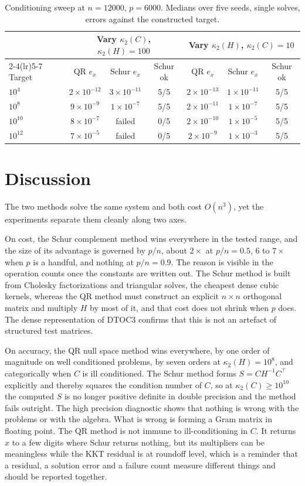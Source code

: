 \documentclass[10pt]{article}
\newcommand{\kap}{\kappa_2}
\begin{document}
\begin{table}[t]
\centering\small
\begin{tabular}{@{}lcccccc@{}}
\toprule
 & \multicolumn{3}{c}{Vary $\kap(C)$, $\kap(H)=100$} & \multicolumn{3}{c}{Vary $\kap(H)$, $\kap(C)=10$}\\
\cmidrule(lr){2-4}\cmidrule(lr){5-7}
Target & QR $e_x$ & Schur $e_x$ & Schur ok & QR $e_x$ & Schur $e_x$ & Schur ok\\
\midrule
$10^{4}$ & $2\times10^{-12}$ & $3\times10^{-11}$ & 5/5 & $2\times10^{-13}$ & $1\times10^{-11}$ & 5/5\\
$10^{8}$ & $9\times10^{-9}$ & $1\times10^{-7}$ & 5/5 & $2\times10^{-11}$ & $1\times10^{-7}$ & 5/5\\
$10^{10}$ & $8\times10^{-7}$ & failed & 0/5 & $2\times10^{-10}$ & $1\times10^{-5}$ & 5/5\\
$10^{12}$ & $7\times10^{-5}$ & failed & 0/5 & $2\times10^{-9}$ & $1\times10^{-3}$ & 5/5\\
\bottomrule
\end{tabular}
\caption{Conditioning sweep at $n=12000$, $p=6000$. Medians over five seeds, single solves,
errors against the constructed target.}
\label{tab:condlarge}
\end{table}

\section{Discussion}\label{sec:discussion}

The two methods solve the same system and both cost $O(n^3)$, yet the experiments
separate them cleanly along two axes.

On cost, the Schur complement method wins everywhere in the tested range, and the size of
its advantage is governed by $p/n$, about $2\times$ at $p/n=0.5$, $6$ to $7\times$ when $p$ is
a handful, and nothing at $p/n=0.9$. The reason is visible in the operation counts once
the constants are written out. The Schur method is built from Cholesky factorizations
and triangular solves, the cheapest dense cubic kernels, whereas the QR method must
construct an explicit $n\times n$ orthogonal matrix and multiply $H$ by most of it, and
that cost does not shrink when $p$ does. The dense representation of DTOC3 confirms that
this is not an artefact of structured test matrices.

On accuracy, the QR null space method wins everywhere, by one order of magnitude on
well conditioned problems, by seven orders at $\kap(H)=10^8$, and categorically when $C$
is ill conditioned. The Schur method forms $S=CH^{-1}C^\top$ explicitly and thereby squares
the condition number of $C$, so at $\kap(C)\ge10^{10}$ the computed $S$ is no longer
positive definite in double precision and the method fails outright. The high precision
diagnostic shows that nothing is wrong with the problems or with the algebra. What is
wrong is forming a Gram matrix in floating point. The QR method is not immune to
ill-conditioning in $C$. It returns $x$ to a few digits where Schur returns nothing, but
its multipliers can be meaningless while the KKT residual is at roundoff level, which is
a reminder that a residual, a solution error and a failure count measure different
things and should be reported together.
\end{document}
